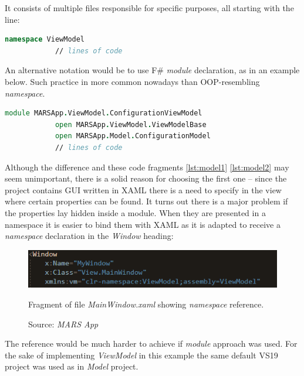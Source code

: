         It consists of multiple files responsible for specific purposes, all starting with the line:
        
        \begin{lstlisting}[language=FSharp, label={lst:model1}, caption=F\# all \textit{ViewModel} project components beginning.]
            namespace ViewModel
            // lines of code
        \end{lstlisting}
        An alternative notation would be to use F\# \textit{module} declaration, as in an example below. Such practice in more common nowadays than OOP-resembling \textit{namespace}.
        \begin{lstlisting}[language=FSharp, label={lst:model2}, caption=F\# alternative example \textit{ViewModel} project component beginning.]
            module MARSApp.ViewModel.ConfigurationViewModel
            open MARSApp.ViewModel.ViewModelBase
            open MARSApp.Model.ConfigurationModel
            // lines of code
        \end{lstlisting}
        Although the difference and these code fragments \ref{lst:model1} \ref{lst:model2} may seem unimportant, there is a solid reason for choosing the first one -- since the project contains GUI written in XAML there is a need to specify in the view where certain properties can be found. It turns out there is a major problem if the properties lay hidden inside a module. When they are presented in a namespace it is easier to bind them with XAML as it is adapted to receive a \textit{namespace} declaration in the \textit{Window} heading:
        \begin{figure}[H]
            \centering
            \includegraphics{img/viewmodel_namespace.png}
            \caption{Fragment of file \textit{MainWindow.xaml} showing \textit{namespace} reference.}
            \caption*{Source: \textit{MARS App}}
            \label{fig:viewmodel_namespace}
        \end{figure}
        The reference would be much harder to achieve if \textit{module} approach was used. For the sake of implementing \textit{ViewModel} in this example the same default VS19 project was used as in \textit{Model} project.
